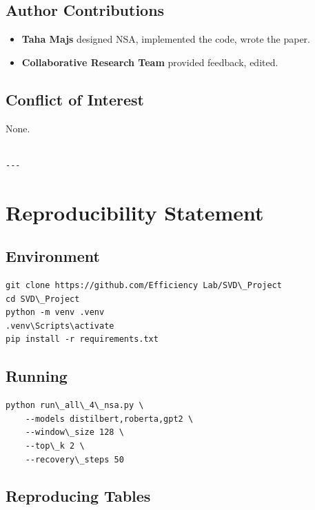 \subsection{Author Contributions}

\begin{itemize}
\item \textbf{Taha Majs} designed NSA, implemented the code, wrote the paper.
\item \textbf{Collaborative Research Team} provided feedback, edited.

\end{itemize}
\subsection{Conflict of Interest}

None.
\begin{lstlisting}

---
\end{lstlisting}


\section{Reproducibility Statement}

\subsection{Environment}

\begin{lstlisting}
git clone https://github.com/Efficiency Lab/SVD\_Project
cd SVD\_Project
python -m venv .venv
.venv\Scripts\activate
pip install -r requirements.txt
\end{lstlisting}

\subsection{Running}

\begin{lstlisting}
python run\_all\_4\_nsa.py \
    --models distilbert,roberta,gpt2 \
    --window\_size 128 \
    --top\_k 2 \
    --recovery\_steps 50
\end{lstlisting}

\subsection{Reproducing Tables}

